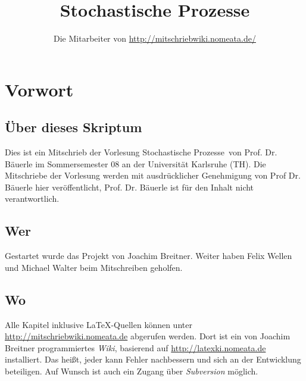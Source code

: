 \documentclass[a4paper,twoside,DIV15,BCOR12mm]{scrbook}
\author{Die Mitarbeiter von \url{http://mitschriebwiki.nomeata.de/}}
\title{Stochastische Prozesse}
\begin{document}
\maketitle
 
\newenvironment{enuma}{%
\begin{enumerate}[\hspace{1em}a)]%
}{%
\end{enumerate}%
}

\newenvironment{enumi}{%
\begin{enumerate}[\hspace{1em}i)]%
}{%
\end{enumerate}%
}

\setcounter{secnumdepth}{-1}
\tableofcontents


\chapter{Vorwort}
\setcounter{secnumdepth}{2}

\section*{Über dieses Skriptum}
Dies ist ein Mitschrieb der Vorlesung \glqq Stochastische Prozesse\grqq\ von Prof. Dr. Bäuerle im
Sommersemester 08 an der Universität Karlsruhe (TH).
Die Mitschriebe der Vorlesung werden mit ausdrücklicher Genehmigung von Prof Dr. Bäuerle hier veröffentlicht,
Prof. Dr. Bäuerle ist für  den Inhalt nicht verantwortlich.
\section*{Wer}
Gestartet wurde das Projekt von Joachim Breitner.
Weiter haben Felix Wellen und Michael Walter beim Mitschreiben geholfen.

\section*{Wo}
Alle Kapitel inklusive \LaTeX-Quellen können unter \url{http://mitschriebwiki.nomeata.de} abgerufen werden.
Dort ist ein von Joachim Breitner programmiertes \emph{Wiki}, basierend auf \url{http://latexki.nomeata.de} installiert. 
Das heißt, jeder kann Fehler nachbessern und sich an der Entwicklung
beteiligen. Auf Wunsch ist auch ein Zugang über \emph{Subversion} möglich.
\end{document}
